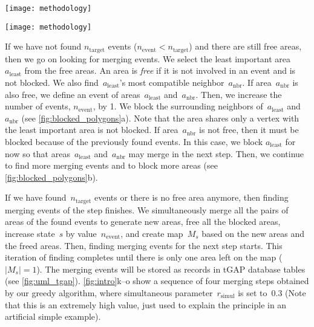 \documentclass[twocolumn]{svjour3}          %
\begin{document}
\begin{figure*}[tb]
\centering
\texttt{[image: methodology]}
\caption{The flowchart of our greedy algorithm.
}
\label{fig:greedy_framework}
\end{figure*}


\begin{figure*}[tb]
\centering
\texttt{[image: methodology]}
\caption{The process of finding simultaneous merging events for a step, 
    where simultaneous parameter $r_\mathrm{simul} = 0.3$.
    (a) From all the free areas,
	the least important one is selected to merge into
	its most compatible neighbor.
	Then the surrounding areas are blocked (marked by the crosses).
	(b) Next, the least important area from the remaining free areas
	is selected to merge with the most compatible neighbor,
	and the surrounding areas are also blocked.
}
\label{fig:blocked_polygons}
\end{figure*}

If we have not found $n_\mathrm{target}$ events 
($n_\mathrm{event} < n_\mathrm{target}$)
and there are still free areas,
then we go on looking for merging events.
We select the least important area~$a_\mathrm{least}$
from the free areas.
An area is \emph{free} if 
it is not involved in an event and is not blocked.
We also find~$a_\mathrm{least}$'s 
most compatible neighbor~$a_\mathrm{nbr}$.
If area~$a_\mathrm{nbr}$ is also free, 
we define an event of areas~$a_\mathrm{least}$ and~$a_\mathrm{nbr}$.
Then, we increase the number of events, $n_\mathrm{event}$, by 1.
We block the surrounding neighbors of~$a_\mathrm{least}$ and~$a_\mathrm{nbr}$
(see \fig\ref{fig:blocked_polygons}a).
Note that the area shares only a vertex 
with the least important area is not blocked.
If area~$a_\mathrm{nbr}$ is not free,
then it must be blocked because of the previously found events.
In this case, we block $a_\mathrm{least}$ for now
so that areas~$a_\mathrm{least}$ and~$a_\mathrm{nbr}$ 
may merge in the next step.
Then, we continue to find more merging events and to block more areas
(see \fig\ref{fig:blocked_polygons}b).

If we have found~$n_\mathrm{target}$ events 
or there is no free area anymore,
then finding merging events of the step finishes.
We simultaneously merge all the pairs of areas of the found events
to generate new areas,
free all the blocked areas,
increase state~$s$ by value~$n_\mathrm{event}$,
and create map~$M_s$ based on the new areas and the freed areas.
Then, finding merging events for the next step starts.
This iteration of finding completes 
until there is only one area left on the map ($|M_s|=1$).
The merging events will be stored as records in tGAP database tables
(see \fig\ref{fig:uml_tgap}).
\figs\ref{fig:intro}k--o show a sequence of four merging steps
obtained by our greedy algorithm,
where simultaneous parameter~$r_\mathrm{simul}$ is set to~$0.3$
(Note that this is an extremely high value, 
just used to explain the principle in an artificial simple example).
\end{document}
